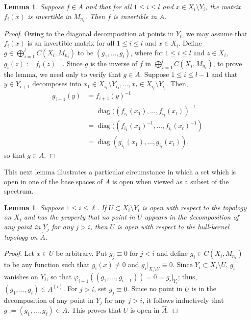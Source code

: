 \documentclass[12pt]{amsart}
\numberwithin{equation}{section}
\newtheorem{lemma}[theorem]{Lemma}
\theoremstyle{definition}
\theoremstyle{remark}
\newcommand{\diag}{\operatorname{diag}}
\begin{document}
\begin{lemma}
	\label{non-invertible at point}
	Suppose $f\in A$ and that for all $1\leq i\leq l$ and $x\in X_{i}\setminus Y_{i}$, the matrix $f_{i}(x)$ is invertible in $M_{n_{i}}$. Then $f$ is invertible in $A$.
\end{lemma}
\begin{proof}
	Owing to the diagonal decomposition at points in $Y_{i}$, we may assume that $f_{i}(x)$ is an invertible matrix for all $1\leq i\leq l$ and $x\in X_{i}$. Define $g\in\bigoplus_{i=1}^{ l }C(X_{i},M_{n_{i}})$ to be $(g_{1},\ldots,g_{ l })$, where for $1\leq i\leq  l $ and $z\in X_{i}$, $g_{i}(z):=f_{i}(z)^{-1}$. 
	Since $g$ is the inverse of $f$ in $\bigoplus_{i=1}^{ l }C(X_{i},M_{n_{i}})$, to prove the lemma, we need only to verify that $g\in A$. Suppose $1\leq i\leq  l -1$ and that $y\in Y_{i+1}$ decomposes into $x_{1}\in X_{i_{1}}\setminus Y_{i_{1}},\ldots,x_{t}\in X_{i_{t}}\setminus Y_{i_{t}}$. Then,
	$$
	\begin{aligned}
		g_{i+1}(y)&=f_{i+1}(y)^{-1}\\
		&=\diag((f_{i_{1}}(x_{1}),\ldots,f_{i_{t}}(x_{t}))^{-1}\\
		&=\diag((f_{i_{1}}(x_{1})^{-1},\ldots,f_{i_{t}}(x_{t})^{-1})\\
		&=\diag(g_{i_{1}}(x_{1}),\ldots,g_{i_{t}}(x_{t})),
	\end{aligned}
	$$ 
	so that $g\in A$. 
\end{proof}	

This next lemma illustrates a particular circumstance in which a set which is open in one of the base spaces of $A$ is open when viewed as a subset of the spectrum.

\begin{lemma}
	\label{open in spectrum}
	Suppose $1\leq i\leq \ell$. If $U\subset X_{i}\setminus Y_{i}$ is open with respect to the topology on $X_{i}$ and has the property that no point in $U$ appears in the decomposition of any point in $Y_{j}$ for any $j>i$, then $U$ is open with respect to the hull-kernel topology on $\hat{A}$. 
\end{lemma}

\begin{proof}
	Let $x\in U$ be arbitrary. Put $g_{j}\equiv0$ for $j<i$ and define $g_{i}\in C(X_{i},M_{n_{i}})$ to be any function such that $g_{i}(x)\not=0$ and $g_{i}|_{X_{i}\setminus U}\equiv 0$. Since $Y_{i}\subset X_{i}\setminus U$, $g_{i}$ vanishes on $Y_{i}$, so that $\varphi_{i-1}((g_{1},\ldots,g_{i-1}))=0=g_{i}|_{Y_{i}}$; thus,  $(g_{1},\ldots,g_{i})\in A^{(i)}$. For $j>i$, set $g_{j}\equiv 0$. Since no point in $U$ is in the decomposition of any point in $Y_{j}$ for any $j>i$, it follows inductively that $g:=(g_{1},\ldots,g_{\ell})\in A$. This proves that $U$ is open in $\hat{A}$. 
\end{proof}	
\end{document}
